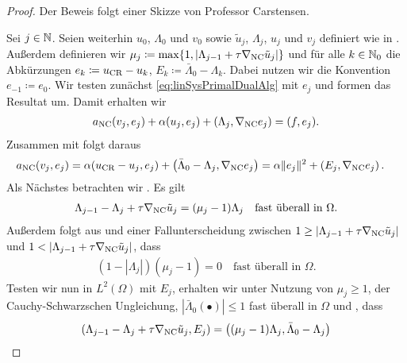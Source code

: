 \begin{proof}
  Der Beweis folgt einer Skizze von Professor Carstensen.
  
  Sei $j\in\mathbb{N}$. 
  Seien weiterhin $u_0$, $\Lambda_0$ und $v_0$ sowie $\tilde{u}_j$,
  $\Lambda_j$, $u_j$ und $v_j$ definiert wie in .
  Außerdem definieren wir $\mu_j\coloneqq \max\{1,|\Lambda_{j-1}+\tau \nabla_\textup{NC}
  \tilde{u}_j|\}$ und für alle $k\in\mathbb{N}_0$ die Abkürzungen $e_k \coloneqq
  u_\textup{CR}-u_k$, $E_k\coloneqq \bar\Lambda_0-\Lambda_k$.
  Dabei nutzen wir die Konvention $e_{-1}\coloneqq e_0$.
  Wir testen zunächst \eqref{eq:linSysPrimalDualAlg} mit $e_j$ und formen das
  Resultat um. 
  Damit erhalten wir
  \begin{align*}
    a_\textup{NC}(v_j,e_j) + \alpha(u_j,e_j) 
    + (\Lambda_j,\nabla_\textup{NC} e_j)
    = 
    (f,e_j).
  \end{align*}
  Zusammen mit  folgt daraus
  \begin{equation}
    \label{eq:convProofE}
    \begin{aligned}
      a_\textup{NC}(v_j,e_j) &= 
      \alpha(u_\textup{CR}-u_j,e_j) 
      + \left(\bar\Lambda_0-\Lambda_j,\nabla_\textup{NC} e_j\right) 
      = 
      \alpha\Vert e_j\Vert^2 + \left(E_j,\nabla_\textup{NC} e_j\right).
    \end{aligned}
  \end{equation}
  Als Nächstes betrachten wir . Es gilt
  \begin{align}
    \label{eq:convProofA}
    \Lambda_{j-1}-\Lambda_j+\tau \nabla_\textup{NC} \tilde{u}_j 
    = (\mu_j-1)\Lambda_j \quad\text{fast überall in }\Omega.
  \end{align}
  Außerdem folgt aus  und einer
  Fallunterscheidung zwischen $1\geq |\Lambda_{j-1}+\tau\nabla_\textup{NC} \tilde{u}_j|$
  und $1< |\Lambda_{j-1}+\tau\nabla_\textup{NC} \tilde{u}_j|$, dass
  \begin{align}
    \label{eq:convergenceIterationMuProductZero}
    \left(1-|\Lambda_j|\right)(\mu_j-1)=0
    \quad\text{fast überall in } \Omega.
  \end{align}
  Testen wir nun  in $L^2(\Omega)$ mit $E_j$, erhalten wir 
  unter Nutzung von $\mu_j\geq 1$, der Cauchy-Schwarzschen Ungleichung,
  $\left|\bar\Lambda_0(\bullet)\right|\leq 1$ fast überall in $\Omega$ und
  , dass
  \begin{align*}
    \left( \Lambda_{j-1}-\Lambda_j+\tau\gradnc \tilde{u}_j, E_j\right)
    &= 
    \left( (\mu_j-1)\Lambda_j,\bar\Lambda_0-\Lambda_j\right)\\

\end{align*}
\end{proof}
